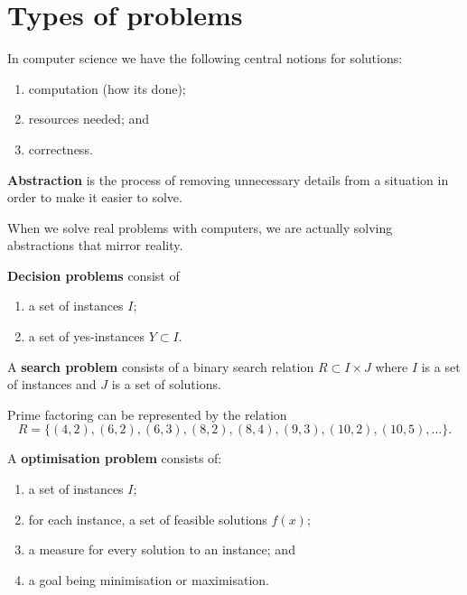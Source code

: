 \chapter{Types of problems}

In computer science we have the following central notions for solutions:
\begin{enumerate}
    \item computation (how its done);
    \item resources needed; and
    \item correctness.
\end{enumerate}

\begin{definition}[Abstraction]
    \textbf{Abstraction} is the process of removing unnecessary details from a situation in order to make it easier to solve.
\end{definition}

When we solve real problems with computers, we are actually solving abstractions that mirror reality. 

\begin{definition}
    \textbf{Decision problems} consist of
    \begin{enumerate}
        \item a set of instances $I$;
        \item a set of yes-instances $Y \subset I$.
    \end{enumerate}
\end{definition}

\begin{definition}
    A \textbf{search problem} consists of a binary search relation $R \subset I \times J$ where $I$ is a set of instances and $J$ is a set of solutions.
\end{definition}

\begin{example}
    Prime factoring can be represented by the relation \[ R = \{(4, 2), (6, 2), (6, 3), (8, 2), (8, 4), (9, 3), (10, 2), (10, 5), \ldots\}. \]
\end{example}

\begin{definition}
    A \textbf{optimisation problem} consists of:
    \begin{enumerate}
        \item a set of instances $I$;
        \item for each instance, a set of feasible solutions $f(x)$;
        \item a measure for every solution to an instance; and
        \item a goal being minimisation or maximisation.
    \end{enumerate}
\end{definition}
